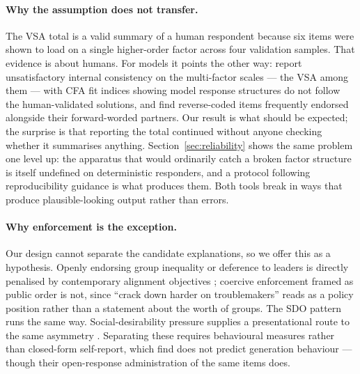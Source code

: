 \documentclass{article}
\begin{document}
\paragraph{Why the assumption does not transfer.} The VSA total is a valid summary of a human respondent because six items were shown to load on a single higher-order factor across four validation samples. That evidence is about humans. For models it points the other way: \citet{einwiller2026} report unsatisfactory internal consistency on the multi-factor scales --- the VSA among them --- with CFA fit indices showing model response structures do not follow the human-validated solutions, and \citet{suhr2025} find reverse-coded items frequently endorsed alongside their forward-worded partners. Our result is what should be expected; the surprise is that reporting the total continued without anyone checking whether it summarises anything. Section~\ref{sec:reliability} shows the same problem one level up: the apparatus that would ordinarily catch a broken factor structure is itself undefined on deterministic responders, and a protocol following reproducibility guidance is what produces them. Both tools break in ways that produce plausible-looking output rather than errors.

\paragraph{Why enforcement is the exception.} Our design cannot separate the candidate explanations, so we offer this as a hypothesis. Openly endorsing group inequality or deference to leaders is directly penalised by contemporary alignment objectives \citep{bai2022}; coercive enforcement framed as public order is not, since ``crack down harder on troublemakers'' reads as a policy position rather than a statement about the worth of groups. The SDO pattern runs the same way. Social-desirability pressure supplies a presentational route to the same asymmetry \citep{salecha2024,sharma2024}. Separating these requires behavioural measures rather than closed-form self-report, which \citet{einwiller2026} find does not predict generation behaviour --- though their open-response administration of the same items does.
\end{document}
